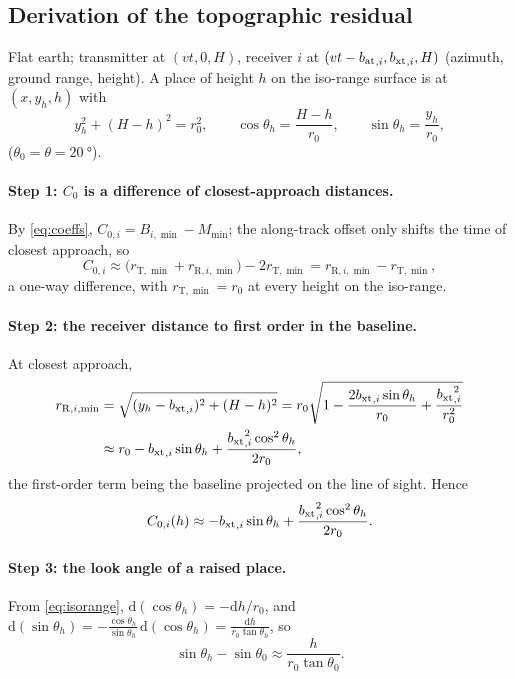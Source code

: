 \subsection{Derivation of the topographic residual}\label{sec:dc0-proof}

Flat earth; transmitter at $(vt,0,H)$, receiver $i$ at $(vt-{b_{\mathrm{at}}}_{,i},{b_{\mathrm{xt}}}_{,i},H)$ (azimuth, ground range, height). A
place of height $h$ on the iso-range surface is at $(x,y_h,h)$ with
\begin{equation}
  y_h^2+(H-h)^2=r_0^2 ,\qquad \cos\theta_h=\frac{H-h}{r_0},\qquad \sin\theta_h=\frac{y_h}{r_0},
  \label{eq:isorange}
\end{equation}
($\theta_0=\theta=\SI{20}{\degree}$).

\paragraph{Step 1: $C_0$ is a difference of closest-approach distances.} By \eqref{eq:coeffs},
$C_{0,i}=B_{i,\min}-M_{\min}$; the along-track offset only shifts the time of closest approach, so
\begin{equation}
  C_{0,i}\approx\bigl(r_{\mathrm T,\min}+r_{\mathrm R,i,\min}\bigr)-2r_{\mathrm T,\min}=r_{\mathrm R,i,\min}-r_{\mathrm T,\min},
\end{equation}
a one-way difference, with $r_{\mathrm T,\min}=r_0$ at every height on the iso-range.

\paragraph{Step 2: the receiver distance to first order in the baseline.} At closest approach,
\begin{align}
  r_{\mathrm R,i,\min}&=\sqrt{(y_h-{b_{\mathrm{xt}}}_{,i})^2+(H-h)^2}
  =r_0\sqrt{1-\frac{2{b_{\mathrm{xt}}}_{,i}\sin\theta_h}{r_0}+\frac{{b_{\mathrm{xt}}}_{,i}^2}{r_0^2}}\notag\\
  &\approx r_0-{b_{\mathrm{xt}}}_{,i}\sin\theta_h+\frac{{b_{\mathrm{xt}}}_{,i}^2\cos^2\theta_h}{2r_0},
\end{align}
the first-order term being the baseline projected on the line of sight. Hence
\begin{equation}
  C_{0,i}(h)\approx-{b_{\mathrm{xt}}}_{,i}\sin\theta_h+\frac{{b_{\mathrm{xt}}}_{,i}^2\cos^2\theta_h}{2r_0}.
\end{equation}

\paragraph{Step 3: the look angle of a raised place.} From
\eqref{eq:isorange}, $\mathrm d(\cos\theta_h)=-\mathrm dh/r_0$, and
$\mathrm d(\sin\theta_h)=-\frac{\cos\theta_h}{\sin\theta_h}\,\mathrm d(\cos\theta_h)=\frac{\mathrm dh}{r_0\tan\theta_h}$, so
\begin{equation}
  \sin\theta_h-\sin\theta_0\approx\frac{h}{r_0\tan\theta_0}.
\end{equation}

